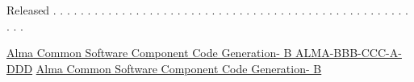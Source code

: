 \documentclass[letterpaper,11pt]{article}
\newcommand\Title{Alma Common Software Component Code Generation}
\newcommand\Version{B}
\newcommand\Document{ALMA-BBB-CCC-A-DDD}
\newcommand\Released{}
\begin{document}
\begin{center}
\footnotesize
\hspace{2.5cm}{Name} \hspace{4cm}{Date} \hspace{2cm}{Signature}
\vspace{1cm}


\normalsize
{\small {\tt \hspace{-5.5cm}{\Released}}}  %
\vspace{-0.3cm}

\large
\hspace{-0.7cm} {Released  \small . . . . . . . . . . . . . . . . . . . . . . . . . . . . . . . . . . . . . . . . . . . . . . . . . . . . . . .}

\footnotesize
\hspace{2.5cm}{Name} \hspace{4cm}{Date} \hspace{2cm}{Signature}
\end{center}

%
\clearpage
\pagestyle{myheadings}
\markboth
{\underline{ \Title - \Version \hspace*{2.5cm} \Document}}   %
{\underline{ \Title - \Version \hspace*{2.5cm} }}   %

\end{document}
